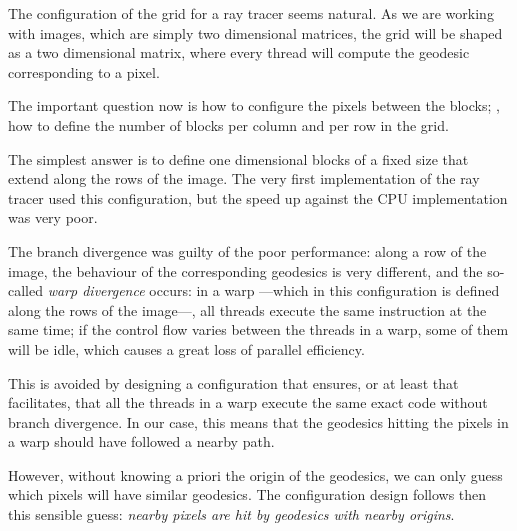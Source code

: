 The configuration of the grid for a ray tracer seems natural. As we are working with images, which are simply two dimensional matrices, the grid will be shaped as a two dimensional matrix, where every thread will compute the geodesic corresponding to a pixel.

The important question now is how to configure the pixels between the blocks; \ie, how to define the number of blocks per column and per row in the grid.

The simplest answer is to define one dimensional blocks of a fixed size that extend along the rows of the image. The very first implementation of the ray tracer used this configuration, but the speed up against the \ac{CPU} implementation was very poor.

The branch divergence was guilty of the poor performance: along a row of the image, the behaviour of the corresponding geodesics is very different, and the so-called \emph{warp divergence} occurs: in a warp ---which in this configuration is defined along the rows of the image---, all threads execute the same instruction at the same time; if the control flow varies between the threads in a warp, some of them will be idle, which causes a great loss of parallel efficiency.

This is avoided by designing a configuration that ensures, or at least that facilitates, that all the threads in a warp execute the same exact code without branch divergence. In our case, this means that the geodesics hitting the pixels in a warp should have followed a nearby path.

However, without knowing a priori the origin of the geodesics, we can only guess which pixels will have similar geodesics. The configuration design follows then this sensible guess: \emph{nearby pixels are hit by geodesics with nearby origins}.

